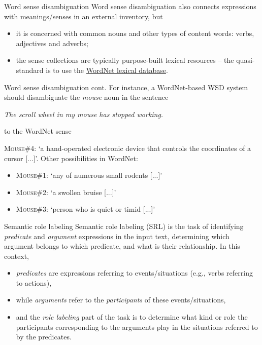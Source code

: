 \documentclass[style=upen, size=14pt]{powerdot}
\newcommand{\gold}{\color{arany}}
\begin{document}
\begin{slide}[toc=WSD]{Word sense disambiguation}
  Word sense disambiguation also connects expressions with meanings/senses in an
  external inventory, but
  \begin{itemize}
  \item it is concerned with common nouns and other types of content words:
    verbs, adjectives and adverbs;
  \item the sense collections are typically purpose-built lexical resources --
    the quasi-standard is to use the
    \href{https://en.wikipedia.org/wiki/WordNet}{WordNet lexical database}.
  \end{itemize}
\end{slide}

\begin{slide}[toc=]{Word sense disambiguation cont.}
  For instance, a WordNet-based WSD system should disambiguate the \emph{mouse}
  noun in the sentence\bigskip

  \emph{The scroll wheel in my mouse has stopped working.}\bigskip

  to the WordNet sense\bigskip 

  \textsc{Mouse}\#4: `a hand-operated electronic device
  that controls the coordinates of a cursor [...]'. Other possibilities in WordNet:
  \begin{itemize}
  \item \textsc{Mouse}\#1: `any of numerous small rodents [...]'
  \item \textsc{Mouse}\#2: `a swollen bruise [...]'
  \item \textsc{Mouse}\#3: `person who is quiet or timid [...]'
  \end{itemize}
  
\end{slide}


\begin{slide}[toc=Semantic role labeling]{Semantic role labeling}
  Semantic role labeling (SRL) is the task of identifying \emph{\gold predicate}
  and \emph{\gold argument} expressions in the input text, determining which
  argument belongs to which predicate, and what is their relationship. In this
  context,
  \begin{itemize}
  \item \emph{\gold predicates} are expressions referring to events/situations (e.g., verbs
    referring to actions),
  \item while \emph{\gold arguments} refer to the \emph{participants} of these
    events/situations,
  \item and the \emph{\gold role labeling} part of the task is to determine what
    kind or role the participants corresponding to the arguments play in the
    situations referred to by the predicates.
\end{itemize}
\end{slide}
\end{document}
